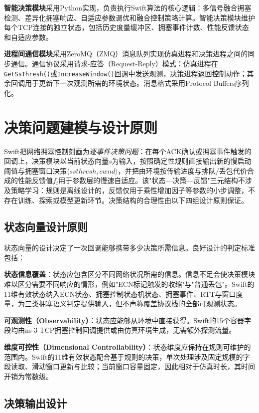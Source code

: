 \textbf{智能决策模块}采用Python实现，负责执行Swift算法的核心逻辑：多信号融合拥塞检测、差异化拥塞响应、自适应参数调优和融合控制策略计算。智能决策模块维护每个TCP连接的独立状态，包括历史度量缓冲区、拥塞事件计数、性能反馈状态和自适应参数。

\textbf{进程间通信模块}采用ZeroMQ（ZMQ）消息队列实现仿真进程和决策进程之间的同步通信。通信协议采用请求-应答（Request-Reply）模式：仿真进程在\texttt{GetSsThresh()}或\texttt{IncreaseWindow()}回调中发送观测，决策进程返回控制动作；其余回调用于更新下一次观测所需的环境状态。消息格式采用Protocol Buffers序列化。

\section{决策问题建模与设计原则}

Swift把网络拥塞控制刻画为\emph{逐事件决策问题}：在每个ACK确认或拥塞事件触发的回调上，决策模块以当前状态向量$s$为输入，按照确定性规则直接输出新的慢启动阈值与拥塞窗口决策$\langle ssthresh, cwnd\rangle$，并把由环境按传输进度与排队/丢包代价合成的性能反馈值$f_t$用于参数层的慢速自适应。该"状态—决策—反馈"三元结构不涉及策略学习：规则是离线设计的，反馈仅用于乘性增加因子等参数的小步调整，不存在训练、探索或模型更新环节。决策结构的合理性由以下四组设计原则保证。

\subsection{状态向量设计原则}

状态向量的设计决定了一次回调能够携带多少决策所需信息。良好设计的判定标准包括：

\textbf{状态信息覆盖}：状态应包含区分不同网络状况所需的信息。信息不足会使决策模块难以区分需要不同响应的情形，例如"ECN标记触发的收缩"与"普通丢包"。Swift的11维有效状态纳入ECN状态、拥塞控制状态机状态、拥塞事件、RTT与窗口度量，为三类拥塞语义判定提供输入，但不声称覆盖协议栈的全部可观测状态。

\textbf{可观测性（Observability）}：状态应能够从环境中直接获得。Swift的15个容器字段均由ns-3 TCP拥塞控制回调提供或由仿真环境生成，无需额外探测流量。

\textbf{维度可控性（Dimensional Controllability）}：状态维度应保持在规则可维护的范围内。Swift的11维有效状态配合基于规则的决策，单次处理涉及固定规模的字段读取、滑动窗口更新与比较；当前窗口容量固定，因此相对于仿真时长，其时间开销为常数级。

\subsection{决策输出设计}

